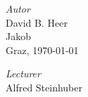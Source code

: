 \begin{titlepage}
\begin{center}
	\begin{minipage}{0.4\textwidth}
	    \begin{flushleft} \large
		\emph{Autor}\\
	        David B. Heer\\ 
	        Jakob  \\
		Graz, \today
	    \end{flushleft}
	\end{minipage}
	\hfill
	\begin{minipage}{0.4\textwidth}
	    \begin{flushright} \large
	        \emph{Lecturer} \\
	        Alfred Steinhuber \\ ~ \\
	    \end{flushright}
	\end{minipage}
	
	\end{center}

\end{titlepage}
